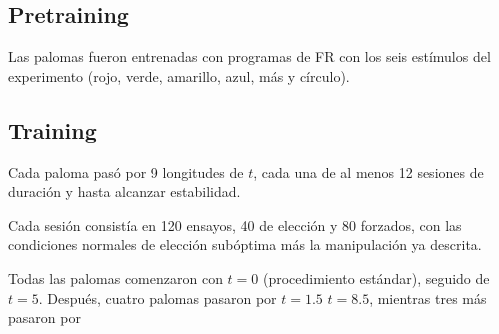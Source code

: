 \documentclass[a4paper,12pt]{article}
\begin{document}
\subsection{Pretraining}

Las palomas fueron entrenadas con programas de FR con los seis estímulos del experimento (rojo, verde, amarillo, azul, más y círculo).

\subsection{Training}

Cada paloma pasó por 9 longitudes de $t$, cada una de al menos 12 sesiones de duración y hasta alcanzar estabilidad.

Cada sesión consistía en 120 ensayos, 40 de elección y 80 forzados, con las condiciones normales de elección subóptima más la manipulación ya descrita.

Todas las palomas comenzaron con $t = 0$ (procedimiento estándar), seguido de $t = 5$.
Después, cuatro palomas pasaron por $t = 1.5$ \textrightarrow $t = 8.5$, mientras tres más pasaron por 
\end{document}
